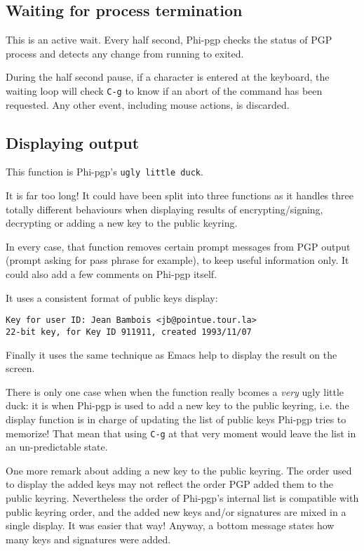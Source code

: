 \subsection{Waiting for process termination}

This is an active wait. Every half second, Phi-pgp checks the status of
PGP process and detects any change from running to exited. 

During the   half second  pause, if  a  character is   entered  at the
keyboard, the waiting loop will check {\tt C-g} to know if an abort of
the command has  been  requested.  Any  other event,  including  mouse
actions, is discarded.

\subsection{Displaying output}

This function is   Phi-pgp's  {\tt ugly little duck}.

It is far too  long! It could have  been split into three functions as
it handles three totally  different behaviours when displaying results
of encrypting/signing, decrypting or  adding a new  key to the  public
keyring.

In every case, that function removes certain  prompt messages from PGP
output (prompt asking   for pass phrase  for example),  to keep useful
information only. It could also add a few comments on Phi-pgp itself.

It uses a consistent format of public keys display:
\begin{verbatim}
Key for user ID: Jean Bambois <jb@pointue.tour.la>
22-bit key, for Key ID 911911, created 1993/11/07
\end{verbatim} 

Finally it uses the same  technique as Emacs help  to display the result
on the screen.

There is only one  case when when  the function  really bcomes  a {\it
very} ugly little duck: it is when Phi-pgp is used to add a new key to
the public  keyring,   i.e.  the display  function   is in charge  of
updating the list of public keys  Phi-pgp tries to memorize! That mean
that using {\tt C-g} at  that very moment would leave  the list in an
un-predictable state.

One more remark   about adding a new   key to the  public keyring. The
order used to display  the added keys may  not  reflect the  order PGP
added them to the public keyring.  Nevertheless the order of Phi-pgp's
internal list is compatible with public  keyring order, and the added
new  keys and/or  signatures are mixed  in  a single display.  It  was
easier that  way! Anyway, a  bottom message states   how many keys and
signatures were added.

